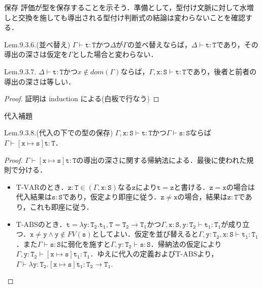 \documentclass[9pt]{beamer}
\begin{document}
\begin{frame}{保存}
評価が型を保存することを示そう．準備として，型付け文脈に対して水増しと交換を施しても導出される型付け判断式の結論は変わらないことを確認する．
\begin{alertblock}{Lem.9.3.6.(並べ替え)}
$\Gamma\vdash\mathtt{t:T}$かつ$\Delta$が$\Gamma$の並べ替えならば，$\Delta\vdash\mathtt{t:T}$であり，その導出の深さは仮定を$\Gamma$とした場合と変わらない．
\end{alertblock}
\begin{alertblock}{Lem.9.3.7.}
$\Delta\vdash \mathtt{t:T}$かつ$x\notin\mathrel{dom}(\Gamma)$ならば，$\Gamma,\mathtt{x:S\vdash t:T}$であり，後者と前者の導出の深さは等しい．
\end{alertblock}
\begin{proof}
証明は induction による(白板で行なう)
\end{proof}
\end{frame}
\begin{frame}{代入補題}
\begin{alertblock}{Lem.9.3.8.(代入の下での型の保存)}
$\Gamma,\mathtt{x:S\vdash t:T}$かつ$\Gamma\vdash\mathtt{s:S}$ならば$\Gamma\vdash\mathtt{\left[x\mapsto s\right] t:T}$．
\end{alertblock}
\begin{proof}
$\Gamma\vdash\mathtt{\left[x\mapsto s\right] t:T}$の導出の深さに関する帰納法による．最後に使われた規則で分ける．
\begin{itemize}
\item $\mathrm{T}$-$\mathrm{VAR}$のとき．$\mathtt{z:T}\in\left(\Gamma, \mathtt{x:S}\right)$なる$\mathtt{z}$により$\mathtt{t = z}$と書ける．$\mathtt{z = x}$の場合は代入結果は$\mathtt{s:S}$であり，仮定より即座に従う．$\mathtt{z\neq x}$の場合，結果は$\mathtt{z:T}$であり，これも即座に従う．
\item $\mathrm{T}$-$\mathrm{ABS}$のとき．$\mathtt{t= \lambda y:T_{2}.t_{1}, T = T_{2}\rightarrow T_{1} }$かつ$\Gamma,\mathtt{x:S, y:T_{2}\vdash t_{1}:T_{1}}$が成り立つ．$\mathtt{x \neq y}\land \mathtt{y}\notin\mathrel{FV}(\mathtt{s})$としてよい．仮定を並び替えると$\Gamma, \mathtt{y:T_{2}, x:S\vdash t_{1}:T_{1}}$．また$\Gamma\vdash \mathtt{s:S}$に弱化を施すと$\Gamma, \mathtt{\mathtt{y:T_{2}\vdash s:S}}$．帰納法の仮定により$\Gamma, \mathtt{y:T_{2}\vdash\left[x\mapsto s\right]t_{1}:T_{1}}$．ゆえに代入の定義および$\mathrm{T}$-$\mathrm{ABS}$より，$\Gamma\vdash\mathtt{\lambda y:T_{2}.\left[x\mapsto s\right]t_{1}:T_{2}\rightarrow T_{1}}$.
\end{itemize}
\end{proof}
\end{frame}
\end{document}
